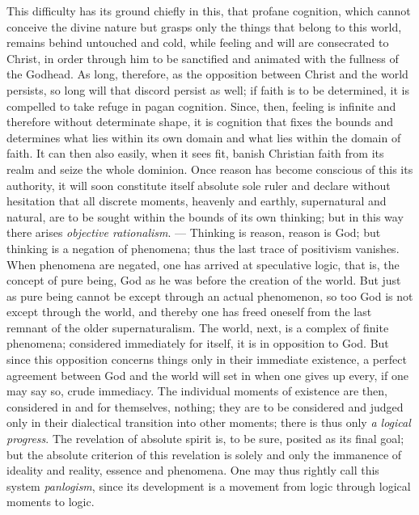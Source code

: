 \documentclass[12pt]{book}
\newcommand{\opage}[1]{\marginnote{\footnotesize\textit{[#1]}}}
\begin{document}
This difficulty has its ground chiefly in this, that profane cognition, which
cannot conceive the divine nature but grasps only the things that belong to
this world, remains behind untouched and cold, while feeling and will are
consecrated to Christ, in order through him to be sanctified and animated
with the fullness of the Godhead. As long, therefore, as the opposition
between Christ and the world persists, so long will that discord persist as
well; if faith is to be determined, it is compelled to take refuge in pagan
cognition. Since, then, feeling is infinite and therefore without determinate
shape, it is cognition that fixes the bounds and determines what lies within
its own domain and what lies within the domain of faith. It can then also
easily, when it sees fit, banish Christian faith from its realm and seize the
whole dominion. Once reason has become conscious of this its authority, it
will soon constitute itself absolute sole ruler and declare without
hesitation that all discrete moments, heavenly and earthly, supernatural and
natural, are to be sought within the bounds of its own thinking; but in this
way there arises \emph{objective rationalism}. --- Thinking is reason, reason
is God; but thinking is a negation of phenomena; thus the last trace of
positivism vanishes. When phenomena are negated, one has arrived at
speculative logic, that is, the concept of pure being, God as he was before
the creation of the world. But just as pure being cannot be except through an
actual phenomenon, so too God is not except through the world, and thereby
one has freed oneself from the
\opage{126} last remnant of the older supernaturalism. The world, next, is a complex of
finite phenomena; considered immediately for itself, it is in opposition to
God. But since this opposition concerns things only in their immediate
existence, a perfect agreement between God and the world will set in when one
gives up every, if one may say so, crude immediacy. The individual moments of
existence are then, considered in and for themselves, nothing; they are to be
considered and judged only in their dialectical transition into other
moments; there is thus only \emph{a logical progress}. The revelation of
absolute spirit is, to be sure, posited as its final goal; but the absolute
criterion of this revelation is solely and only the immanence of ideality and
reality, essence and phenomena. One may thus rightly call this system
\emph{panlogism}, since its development is a movement from logic through
logical moments to logic.
\end{document}
